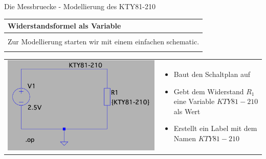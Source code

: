 \begin{frame}[t]{Die Messbruecke - Modellierung des KTY81-210}

    \begin{spacing}{0.9} \begin{tiny}
            \begin{table}[h!]
                \begin{tabular}{p{10cm}}
                    \hline
                    \textbf{Widerstandsformel als Variable} \\
                    \hline                                  \\
                    \begin{minipage}{\textwidth}
                        Zur Modellierung starten wir mit einem einfachen schematic.
                    \end{minipage}
                    \\ \\
                \end{tabular}
                \begin{tabular}{p{3cm} p{7cm}}
                    \begin{minipage}{.3\textwidth}
                        \includegraphics[width=0.8\linewidth]{pictures/kty81_test.png}
                    \end{minipage}
                     &
                    \begin{minipage}{.7\textwidth}
                        \begin{itemize}
                            \item Baut den Schaltplan auf
                            \item Gebt dem Widerstand $R_1$ eine Variable $KTY81-210$ als Wert
                            \item Erstellt ein Label mit dem Namen $KTY81-210$
                        \end{itemize}

\end{minipage}
\end{tabular}
\end{table}
\end{tiny}
\end{spacing}
\end{frame}
